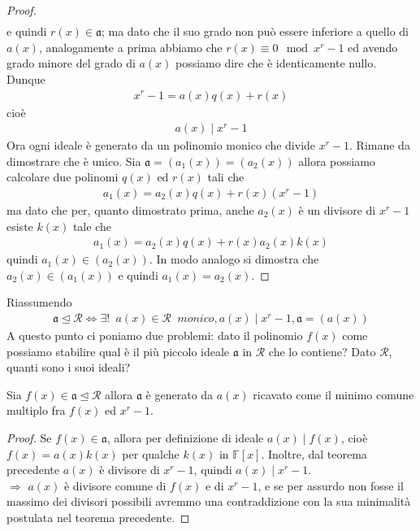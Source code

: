 \begin{proof}
\begin{align*}
   \end{align*}
   e quindi $r(x) \in \mathfrak{a}$; ma dato che il suo grado non può essere inferiore a quello di $a(x)$, analogamente a prima abbiamo che $r(x)\equiv 0 \mod{x^r - 1}$ ed avendo grado minore del grado di $a(x)$ possiamo dire che è identicamente nullo. Dunque
   \begin{align*}
      x^r - 1 = a(x)q(x) + r(x)
   \end{align*}
   cioè 
   \begin{align*}
      a(x) \mid x^r - 1 
   \end{align*}
   Ora ogni ideale è generato da un polinomio monico che divide $x^r-1$. Rimane da dimostrare che è unico.
   Sia $\mathfrak{a} = (a_{1}(x)) = (a_{2}(x))$ allora possiamo calcolare due polinomi $q(x)$ ed $r(x)$ tali che
   \begin{align*}
      a_{1}(x) = a_{2}(x)q(x) + r(x)(x^r - 1)
   \end{align*}
   ma dato che per, quanto dimostrato prima, anche $a_{2}(x)$ è un divisore di $x^r-1$ esiste $k(x)$ tale che
   \begin{align*}
      a_{1}(x) = a_{2}(x)q(x) + r(x)a_{2}(x)k(x)
   \end{align*}
   quindi $a_{1}(x) \in (a_{2}(x))$. In modo analogo si dimostra che $a_{2}(x) \in (a_{1}(x))$ e quindi 
   $a_{1}(x) = a_{2}(x) $.
\end{proof}
\noindent
Riassumendo
\begin{align*}
   \mathfrak{a} \unlhd \mathcal{R} \Leftrightarrow 
      \exists ! \phantom{a}  a(x) \in \mathcal{R} \phantom{a} monico, a(x) \mid x^r - 1 , \mathfrak{a} = (a(x))
\end{align*}
A questo punto ci poniamo due problemi: dato il polinomio $f(x)$ come possiamo stabilire qual è il più piccolo ideale $\mathfrak{a}$ in $\mathcal{R}$ che lo contiene? Dato $\mathcal{R}$, quanti sono i suoi ideali?
\begin{corollario}
   Sia $f(x) \in \mathfrak{a} \unlhd \mathcal{R}$ allora $\mathfrak{a}$ è generato da $a(x)$ ricavato come il minimo comune multiplo fra $f(x)$ ed $x^r - 1$.
\end{corollario}
\begin{proof}
   Se $f(x) \in \mathfrak{a}$, allora per definizione di ideale $a(x) \mid f(x)$, cioè $f(x) = a(x)k(x)$ per qualche $k(x)$ in $\mathbb{F}[x]$. Inoltre, dal teorema precedente $a(x)$ è divisore di $x^r-1$, quindi $a(x) \mid x^r - 1$.\\ $\Longrightarrow$ $a(x)$ è divisore comune di $f(x)$ e di $x^r-1$, e se per assurdo non fosse il massimo dei divisori possibili avremmo una contraddizione con la sua minimalità postulata nel teorema precedente.
\end{proof}
